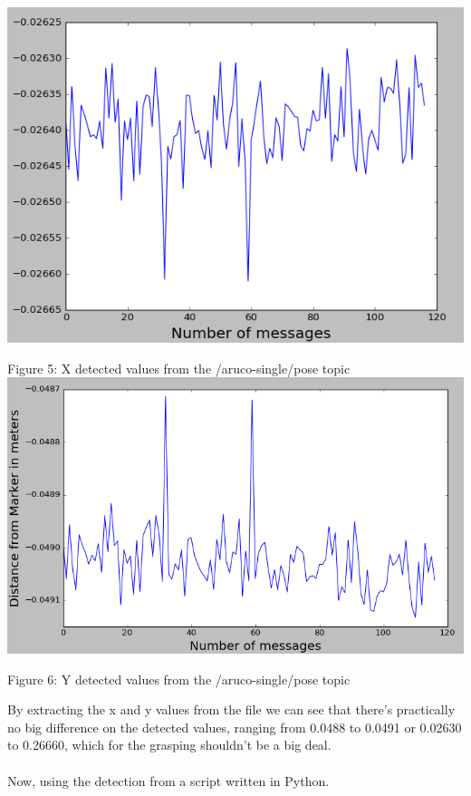\documentclass{article}
\begin{document}
\begin{center}
    \includegraphics[scale=0.5]{pic6.png}
    
    Figure 5: X detected values from the /aruco-single/pose topic
    \includegraphics[scale=0.5]{pic7.png}
    
    Figure 6: Y detected values from the /aruco-single/pose topic
\end{center}
By extracting the x and y values from the file we can see that there's practically no big difference on the detected values, ranging from 0.0488 to 0.0491 or 0.02630 to 0.26660, which for the grasping shouldn't be a big deal.\\
\\
Now, using the detection from a script written in Python.
\end{document}

